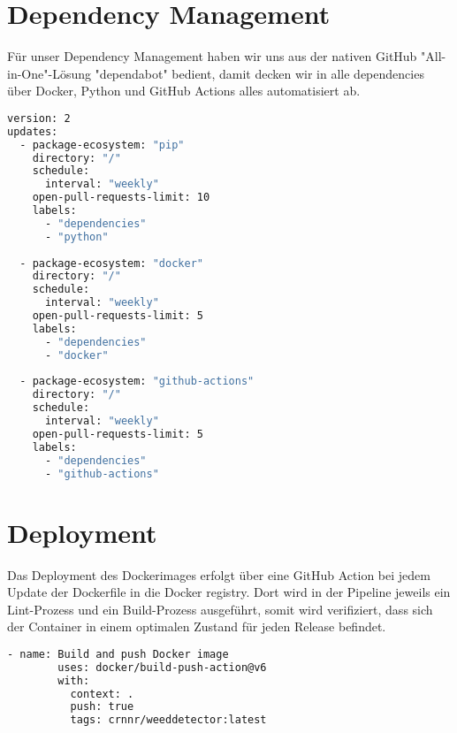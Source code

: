 \documentclass[12pt, a4paper]{scrreprt}
\begin{document}
\newpage

\section{Dependency Management}
Für unser Dependency Management haben wir uns aus der nativen GitHub "All-in-One"-Lösung "dependabot" bedient, damit decken wir in alle dependencies über Docker, Python und GitHub Actions alles automatisiert ab.

\begin{lstlisting}[language=Bash, caption=Bandit via GitHub Actions]
version: 2
updates:
  - package-ecosystem: "pip"
    directory: "/"
    schedule:
      interval: "weekly"
    open-pull-requests-limit: 10
    labels:
      - "dependencies"
      - "python"
    
  - package-ecosystem: "docker"
    directory: "/"
    schedule:
      interval: "weekly"
    open-pull-requests-limit: 5
    labels:
      - "dependencies"
      - "docker"
      
  - package-ecosystem: "github-actions"
    directory: "/"
    schedule:
      interval: "weekly"
    open-pull-requests-limit: 5
    labels:
      - "dependencies"
      - "github-actions"
\end{lstlisting}

\section{Deployment}
Das Deployment des Dockerimages erfolgt über eine GitHub Action bei jedem Update der Dockerfile in die Docker registry. Dort wird in der Pipeline jeweils ein Lint-Prozess und ein Build-Prozess ausgeführt, somit wird verifiziert, dass sich der Container in einem optimalen Zustand für jeden Release befindet.

\begin{lstlisting}[language=Bash, caption=Bandit via GitHub Actions]
      - name: Build and push Docker image
        uses: docker/build-push-action@v6
        with:
          context: .
          push: true
          tags: crnnr/weeddetector:latest
\end{lstlisting}
\end{document}
